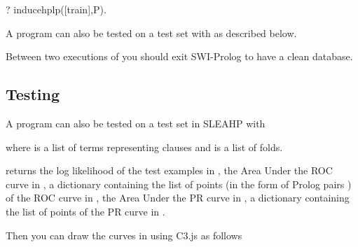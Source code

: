 \documentclass[letterpaper,10pt,english]{sphinxmanual}
\begin{document}
\begin{sphinxVerbatim}[commandchars=\\\{\}]
?\PYGZhy{} induce\PYGZus{}hplp([train],P).
\end{sphinxVerbatim}

A program can also be tested on a test set with   as described below.

Between two executions of  you should exit SWI-Prolog to have a clean database.


\subsection{Testing}
\label{\detokenize{index:testing}}
A program can also be tested on a test set in SLEAHP with

\begin{sphinxVerbatim}[commandchars=\\\{\}]
  
\end{sphinxVerbatim}

where  is a list of terms representing clauses and  is a list of folds.

 returns the log likelihood of the test examples in , the Area Under the ROC curve in , a dictionary containing the list of points (in the form of Prolog pairs ) of the ROC curve in , the Area Under the PR curve in , a dictionary containing the list of points of the PR curve in .

Then you can draw the curves in  using C3.js as follows

\begin{sphinxVerbatim}[commandchars=\\\{\}]
  
\end{sphinxVerbatim}
\end{document}
